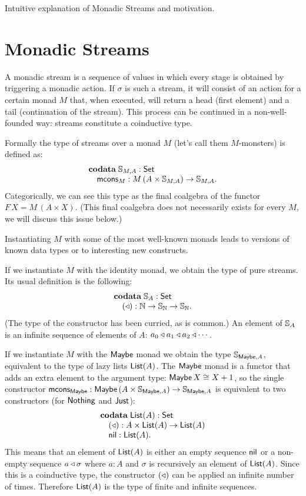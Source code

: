 \documentclass{article}
\begin{document}
Intuitive explanation of Monadic Streams and motivation.

\section{Monadic Streams}

A monadic stream is a sequence of values in which every stage is obtained by triggering a monadic action.
If $\sigma$ is such a stream, it will consist of an action for a certain monad $M$ that, when executed, will return a head (first element) and a tail (continuation of the stream).
This process can be continued in a non-well-founded way: streams constitute a coinductive type.

Formally the type of streams over a monad $M$ (let's call them $M$-monsters) is defined as:
$$
\begin{array}[t]{l}
\mathbf{codata}\;
\mathbb{S}_{M,A}:\mathsf{Set}\\
\quad \mathsf{mcons}_M: M\,(A\times \mathbb{S}_{M,A})\rightarrow\mathbb{S}_{M,A}.
\end{array}
$$
Categorically, we can see this type as the final coalgebra of the functor $F\,X = M\,(A\times X)$. (This final coalgebra does not necessarily exists for every $M$, we will discuss this issue below.)


Instantiating $M$ with some of the most well-known monads leads to versions of known data types or to interesting new constructs.

If we instantiate $M$ with the identity monad, we obtain the type of pure streams.
Its usual definition is the following:
$$
\begin{array}[t]{l}
\mathbf{codata}\;
\mathbb{S}_{A}:\mathsf{Set}\\
\quad (\triangleleft): \mathbb{N}\rightarrow \mathbb{S}_{\mathbb{N}} \rightarrow\mathbb{S}_{\mathbb{N}}.
\end{array}
$$
(The type of the constructor has been curried, as is common.)
An element of $\mathbb{S}_{A}$ is an infinite sequence of elements of $A$: $a_0 \triangleleft a_1\triangleleft a_2\triangleleft \cdots$.

If we instantiate $M$ with the $\mathsf{Maybe}$ monad we obtain the type $\mathbb{S}_{\mathsf{Maybe},A}$, equivalent to the type of lazy lists $\mathsf{List}(A)$.
The $\mathsf{Maybe}$ monad is a functor that adds an extra element to the argument type: $\mathsf{Maybe}\,X \cong X+1$, so the single constructor $\mathsf{mcons}_{\mathsf{Maybe}}: \mathsf{Maybe}\,(A\times \mathbb{S}_{\mathsf{Maybe},A})\rightarrow\mathbb{S}_{\mathsf{Maybe},A}$ is equivalent to two constructors (for $\mathsf{Nothing}$ and $\mathsf{Just}$):
$$
\begin{array}[t]{l}
\mathbf{codata}\;
\mathsf{List}(A):\mathsf{Set}\\
\quad (\triangleleft): A\times \mathsf{List}(A)\rightarrow\mathsf{List}(A)\\
\quad \mathsf{nil}: \mathsf{List}(A).
\end{array}
$$
This means that an element of $\mathsf{List}(A)$ is either an empty sequence $\mathsf{nil}$ or a non-empty sequence $a\triangleleft \sigma$ where $a:A$ and $\sigma$ is recursively an element of $\mathsf{List}(A)$.
Since this is a coinductive type, the constructor $(\triangleleft)$ can be applied an infinite number of times.
Therefore $\mathsf{List}(A)$ is the type of finite and infinite sequences.
\end{document}
